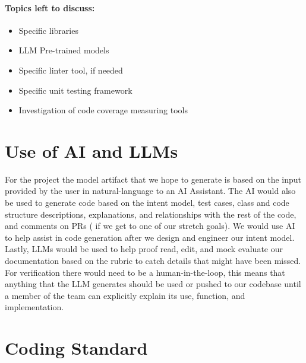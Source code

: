 \documentclass{article}
\begin{document}
\paragraph{Topics left to discuss:}

\begin{itemize}
\item Specific libraries
\item LLM Pre-trained models
\item Specific linter tool, if needed 
\item Specific unit testing framework
\item Investigation of code coverage measuring tools
\end{itemize}


\section{Use of AI and LLMs}


For the project the model artifact that we hope to generate is based on the input provided by the user in natural-language to an AI Assistant. The AI would also be used to generate code based on the intent model, test cases, class and code structure descriptions, explanations, and relationships with the rest of the code, and comments on PRs ( if we get to one of our stretch goals). 
We would use AI to help assist in code generation after we design and engineer our intent model. Lastly, LLMs would be used to help proof read, edit, and mock evaluate our documentation based on the rubric to catch details that might have been missed. 
For verification there would need to be a human-in-the-loop, this means that anything that the LLM generates should be used or pushed to our codebase until a member of the team can explicitly explain its use, function, and implementation. 

\section{Coding Standard}
\end{document}
